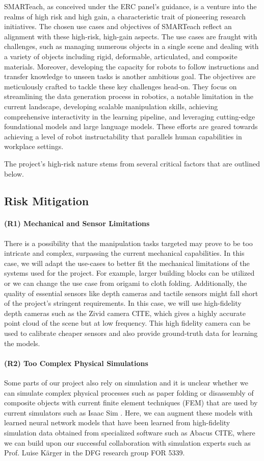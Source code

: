 \documentclass{erc-B2}
\begin{document}
SMARTeach, as conceived under the ERC panel's guidance, is a venture into the realms of high risk and high gain, a characteristic trait of pioneering research initiatives.  The chosen use cases and objectives of SMARTeach reflect an alignment with these high-risk, high-gain aspects. The use cases are fraught with challenges, such as managing numerous objects in a single scene and dealing with a variety of objects including rigid, deformable, articulated, and composite materials. Moreover, developing the capacity for robots to follow instructions and transfer knowledge to unseen tasks is another ambitious goal. The objectives are meticulously crafted to tackle these key challenges head-on. They focus on streamlining the data generation process in robotics, a notable limitation in the current landscape, developing scalable manipulation skills, achieving comprehensive interactivity in the learning pipeline, and leveraging cutting-edge foundational models and large language models. These efforts are geared towards achieving a level of robot instructability that parallels human capabilities in workplace settings. 

The project's high-risk nature stems from several critical factors that are outlined below.
\subsection{Risk Mitigation}
\paragraph{(R1) Mechanical and Sensor Limitations}  There is a possibility that the manipulation tasks targeted may prove to be too intricate and complex, surpassing the current mechanical capabilities. In this case, we will adapt the use-cases to better fit the mechanical limitations of the systems used for the project. For example, larger building blocks can be utilized or we can change the use case from origami to cloth folding. 
Additionally, the quality of essential sensors like depth cameras and tactile sensors might fall short of the project's stringent requirements. In this case, we will use high-fidelity depth cameras such as the Zivid camera CITE, which gives a highly accurate point cloud of the scene but at low frequency. This high fidelity camera can be used to calibrate cheaper sensors and also provide ground-truth data for learning the models. 
\paragraph{(R2) Too Complex Physical Simulations}
Some parts of our project also rely on simulation and it is unclear whether we can simulate complex physical processes such as paper folding or disassembly of composite objects with current finite element techniques (FEM) that are used by current simulators such as Isaac Sim \cite{mittal2023orbit}. Here, we can augment these models with learned neural network models that have been learned from high-fidelity simulation data obtained from specialized software such as Abacus CITE, where we can build upon our successful collaboration with simulation experts such as Prof. Luise Kärger in the DFG research group FOR 5339.
\end{document}
